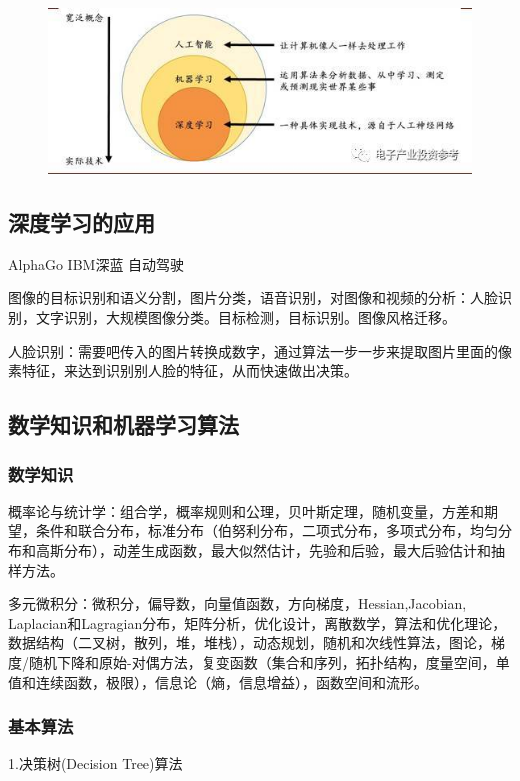 \documentclass[openbib]{article}
\begin{document}
	\begin{figure}[htbp]
		\centering
		\includegraphics[scale=0.4]{1-1}
	\end{figure}
	\subsection{深度学习的应用}
	AlphaGo IBM深蓝 自动驾驶
	
	图像的目标识别和语义分割，图片分类，语音识别，对图像和视频的分析：人脸识别，文字识别，大规模图像分类。目标检测，目标识别。图像风格迁移。
	
	人脸识别：需要吧传入的图片转换成数字，通过算法一步一步来提取图片里面的像素特征，来达到识别别人脸的特征，从而快速做出决策。
	
	\subsection{数学知识和机器学习算法}
	\subsubsection{数学知识}
	概率论与统计学：组合学，概率规则和公理，贝叶斯定理，随机变量，方差和期望，条件和联合分布，标准分布（伯努利分布，二项式分布，多项式分布，均匀分布和高斯分布），动差生成函数，最大似然估计，先验和后验，最大后验估计和抽样方法。
	
	多元微积分：微积分，偏导数，向量值函数，方向梯度，Hessian,Jacobian,\\ Laplacian和Lagragian分布，矩阵分析，优化设计，离散数学，算法和优化理论，数据结构（二叉树，散列，堆，堆栈），动态规划，随机和次线性算法，图论，梯度/随机下降和原始-对偶方法，复变函数（集合和序列，拓扑结构，度量空间，单值和连续函数，极限），信息论（熵，信息增益），函数空间和流形。
	\subsubsection{基本算法}
	\begin{center}
		1.决策树(Decision Tree)算法
	\end{center}
\end{document}

